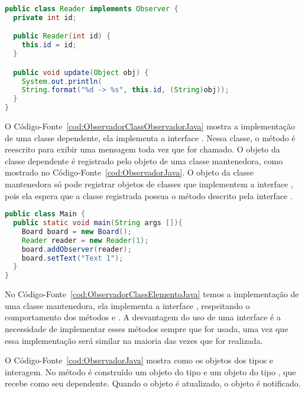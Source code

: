 \begin{lstlisting}[language=Java, caption={Exemplo de implementação da interface \textbf{Observer}}, label={cod:ObservadorClassObservadorJava}]
public class Reader implements Observer {
  private int id;

  public Reader(int id) {
    this.id = id;
  }

  public void update(Object obj) {
    System.out.println(
    String.format("%d -> %s", this.id, (String)obj));
  }
}
\end{lstlisting} 

O Código-Fonte~\ref{cod:ObservadorClassObservadorJava} mostra a implementação de uma classe dependente, ela implementa a interface . Nessa classe, o método  é reescrito para exibir uma mensagem toda vez que for chamado. O objeto da classe dependente é registrado pelo objeto de uma classe mantenedora, como mostrado no Código-Fonte~\ref{cod:ObservadorJava}. O objeto da classe mantenedora só pode registrar objetos de classes que implementem a interface , pois ela espera que a classe registrada possua o método  descrito pela interface .

\begin{lstlisting}[language=Java, caption={Exemplo de uso das classes implementadas em Java}, label={cod:ObservadorJava}]
public class Main {
  public static void main(String args []){
    Board board = new Board();
    Reader reader = new Reader(1);
    board.addObserver(reader);
    board.setText("Text 1");
  }
}
\end{lstlisting}

No Código-Fonte~\ref{cod:ObservadorClassElementoJava} temos a implementação de uma classe mantenedora, ela implementa a interface , respeitando o comportamento dos métodos  e . A desvantagem do uso de uma interface é a necessidade de implementar esses métodos sempre que  for usada, uma vez que essa implementação será similar na maioria das vezes que for realizada.

O Código-Fonte~\ref{cod:ObservadorJava} mostra como os objetos dos tipos  e  interagem. No método  é construído um objeto do tipo  e um objeto do tipo , que recebe  como seu dependente. Quando o objeto  é atualizado, o objeto  é notificado.

